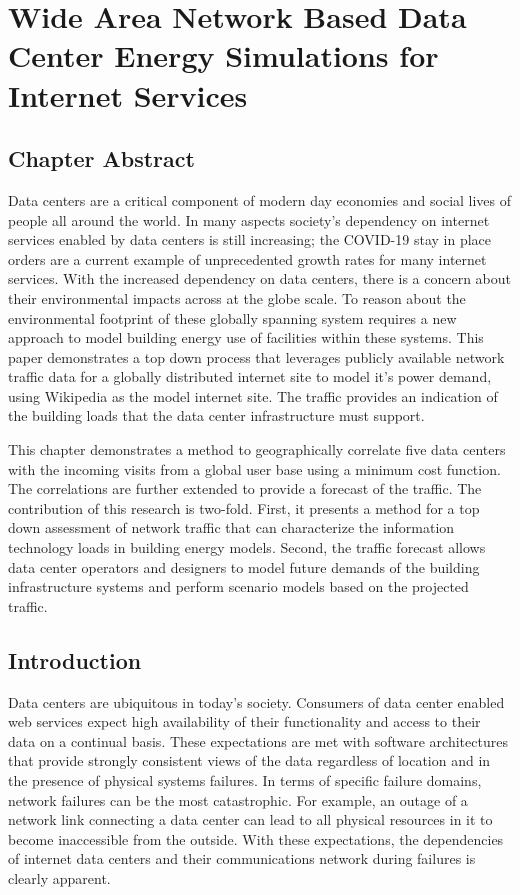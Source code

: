 \chapter{Wide Area Network Based Data Center Energy Simulations for Internet Services}
\label{chp:traffic}

\section{Chapter Abstract}
    Data centers are a critical component of modern day economies and social lives of people all around the world. In many aspects society’s dependency on internet services enabled by data centers is still increasing; the COVID-19 stay in place orders are a current example of unprecedented growth rates for many internet services. With the increased dependency on data centers, there is a concern about their environmental impacts across at the globe scale. To reason about the environmental footprint of these globally spanning system requires a new approach to model building energy use of facilities within these systems. This paper demonstrates a top down process that leverages publicly available network traffic data for a globally distributed internet site to model it’s power demand, using Wikipedia as the model internet site. The traffic provides an indication of the building loads that the data center infrastructure must support.  
    
    This chapter demonstrates a method to geographically correlate five data centers with the incoming visits from a global user base using a minimum cost function. The correlations are further extended to provide a forecast of the traffic. The contribution of this research is two-fold. First, it presents a method for a top down assessment of network traffic that can characterize the information technology loads in building energy models. Second, the traffic forecast allows data center operators and designers to model future demands of the building infrastructure systems and perform scenario models based on the projected traffic. 

\section{Introduction}

    Data centers are ubiquitous in today’s society. Consumers of data center enabled web services expect high availability of their functionality and access to their data on a continual basis. These expectations are met with software architectures that provide strongly consistent views of the data regardless of location and in the presence of physical systems failures. In terms of specific failure domains, network failures can be the most catastrophic. For example, an outage of a network link connecting a data center can lead to all physical resources in it to become inaccessible from the outside. With these expectations, the dependencies of internet data centers and their communications network during failures is clearly apparent.
    
